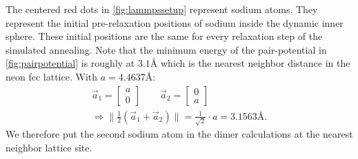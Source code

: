 The centered red dots in \ref{fig:lammpssetup} represent sodium atoms. They represent the initial pre-relaxation positions of sodium inside the dynamic inner sphere. These initial positions are the same for every relaxation step of the simulated annealing. Note that the minimum energy of the pair-potential in \ref{fig:pairpotential} is roughly at $3\text{.}1\si{\angstrom}$ which is the nearest neighbor distance in the neon \ac{fcc} lattice. With $a = 4\text{.}4637\si{\angstrom}$: 
\begin{gather}
	\vec{a}_1=\begin{bmatrix}a\\0\end{bmatrix} \qquad \vec{a}_2=\begin{bmatrix}0\\a\end{bmatrix}\\
	\Rightarrow \|\frac{1}{2}\left(\vec{a}_1+\vec{a}_2\right)\|=\frac{1}{\sqrt{2}}\cdot a = 3\text{.}1563\si{\angstrom}.
\end{gather}  We therefore put the second sodium atom in the dimer calculations at the nearest neighbor lattice site. 
